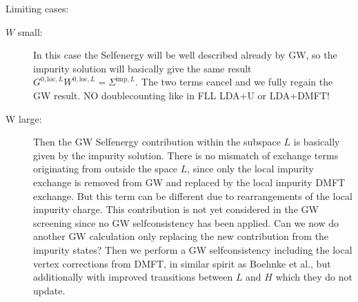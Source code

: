 \documentclass[12pt,a4paper]{scrartcl}
\numberwithin{equation}{section}
\newcommand{\cng}[1]{{\color{red}#1}}
\begin{document}
Limiting cases:
\begin{description}
\item[$W$ small:] In this case the Selfenergy will be well described already by GW, so the impurity solution
will basically give the same result $G^{0,\mathrm{loc},L}W^{0,\mathrm{loc},L} = \Sigma^{\mathrm{imp},L}$.
The two terms cancel and we fully regain the GW result. \cng{NO doublecounting like in FLL LDA+U or LDA+DMFT!}
\item[W large:] Then the GW Selfenergy contribution within the subspace $L$ is basically given by the impurity solution.
There is no mismatch of exchange terms originating from outside the space $L$, since only the local impurity exchange
is removed from GW and replaced by the local impurity DMFT exchange. But this term can be different due to rearrangements
of the local impurity charge. This contribution is not yet considered in the GW screening since no GW selfconsistency
has been applied.
\cng{Can we now do another GW calculation only replacing the new contribution from the impurity states?
Then we perform a GW selfconsistency including the  local vertex corrections from DMFT, in similar spirit as Boehnke et al., but additionally with improved transitions between
$L$ and $H$ which they do not update.}
\end{description}


\end{document}
